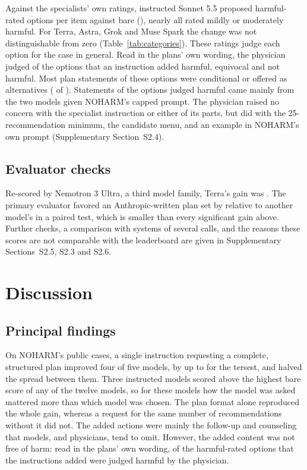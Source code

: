 \documentclass[11pt]{article}
\begin{document}
Against the specialists' own ratings, instructed Sonnet 5.5 proposed \covHarmSonnetPrompt{}
harmful-rated options per item against \covHarmSonnetBare{} bare (\covHarmSonnetDiff{}), nearly all
rated mildly or moderately harmful. For Terra, Astra, Grok and Muse Spark the change was not
distinguishable from zero (Table~\ref{tab:categories}). These ratings judge each option for the case
in general. Read in the plans' own wording, the physician judged \covPhysHarmful{} of the
\covPhysOptions{} options that an instruction added harmful, \covPhysOptionEquivocal{} equivocal and
\covPhysOptionNot{} not harmful. Most plan statements of these options were conditional or offered
as alternatives (\covPhysHedged{} of \covPhysStatements{}). Statements of the options judged
harmful came mainly from the two models given NOHARM's capped prompt. The physician raised no concern with the specialist instruction
or either of its parts, but did with the 25-recommendation minimum, the candidate menu, and an
example in NOHARM's own prompt (Supplementary Section~S2.4).

\subsection*{Evaluator checks}
\label{sec:robust-main}
Re-scored by Nemotron 3 Ultra, a third model family, Terra's gain was \covDPromptTerraJF{}. The
primary evaluator favored an Anthropic-written plan set by \covJudgeInteraction{} relative to
another model's in a paired test, which is smaller than every significant gain above. Further
checks, a comparison with systems of several calls, and the reasons these scores are not
comparable with the leaderboard are given in Supplementary Sections~S2.5,
S2.3 and S2.6.

\FloatBarrier
\section*{Discussion}
\label{sec:discussion}
\subsection*{Principal findings}
On NOHARM's public cases, a single instruction requesting a complete, structured plan improved four
of five models, by up to \covDPromptGrokThorough{} for the tersest, and halved the spread between
them. Three instructed models scored above the highest bare score of any of the twelve models, so
for these models how the model was asked mattered more than which model was chosen. The plan format
alone reproduced the whole gain, whereas a request for the same number of recommendations without
it did not. The added actions were mainly the follow-up and counseling that models, and physicians,
tend to omit. However, the added content was not free of harm: read in the plans' own wording,
\covPhysHarmful{} of the \covPhysOptions{} harmful-rated options that the instructions added were
judged harmful by the physician.
\end{document}
